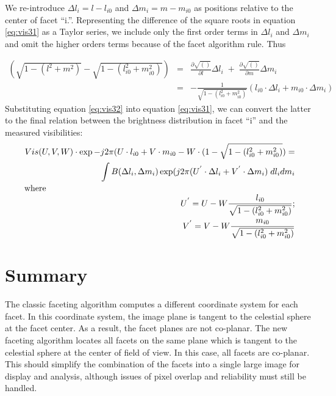 \documentclass[twoside]{article}
\begin{document}
We re-introduce $\Delta l_i = l - l_{i0}$ and $\Delta m_i = m -
m_{i0}$ as positions relative to the center of facet ``i.''.
Representing the difference of the square roots in equation
\ref{eq:vis31} as a Taylor series, we include only the first order
terms in $\Delta l_i$ and $\Delta m_i$ and omit the higher orders
terms because of the facet algorithm rule.  Thus

\begin{eqnarray}
\left(\sqrt{1- (l^2 + m^2)} -  \sqrt{1- (l_{i0}^2 + m_{i0}^2)}\right)
 & = & \frac{\partial \sqrt{()}} {\partial l} \Delta l_i \;+\;
    \frac{\partial \sqrt{()}} {\partial m} \Delta m_i \nonumber \\
 & = & -\frac{1}{\sqrt{1- (l_{i0}^2 + m_{i0}^2)}} (l_{i0} \cdot \Delta
    l_i + m_{i0} \cdot \Delta m_i)  \label{eq:vis32}
\end{eqnarray}
Substituting equation \ref{eq:vis32} into equation \ref{eq:vis31}, we
can convert the latter to the final relation between the brightness
distribution in facet ``i'' and the measured visibilities:
\begin{eqnarray}
 & & Vis(U,V,W) \cdot  \exp -j 2\pi (U \cdot l_{i0} + V \cdot m_{i0}
     -  W \cdot (1- \sqrt{1- (l_{i0}^2 + m_{i0}^2)})  =  \nonumber \\
 & & \int B(\Delta l_i,\Delta m_i) \exp(j 2\pi (U^{'} \cdot \Delta l_i
     + V^{'} \cdot \Delta m_i ) \;  dl_i dm_i   \label{eq:vis33} \\
\noalign{where}
 & & U^{'} = U - W \frac{l_{i0}} {\sqrt{1- (l_{i0}^2+ m_{i0}^2)}};
   \nonumber \\  \; \;
 & & V^{'} = V - W \frac{m_{i0}} {\sqrt{1- (l_{i0}^2+ m_{i0}^2)}}
   \nonumber
\end{eqnarray}

\vfill\eject
\section{Summary}

The classic faceting algorithm computes a different coordinate system
for each facet.  In this coordinate system, the image plane is tangent
to the celestial sphere at the facet center.  As a result, the facet
planes are not co-planar.  The new faceting algorithm locates all
facets on the same plane which is tangent to the celestial sphere at
the center of field of view.  In this case, all facets are co-planar.
This should simplify the combination of the facets into a single large
image for display and analysis, although issues of pixel overlap and
reliability must still be handled.
\end{document}
